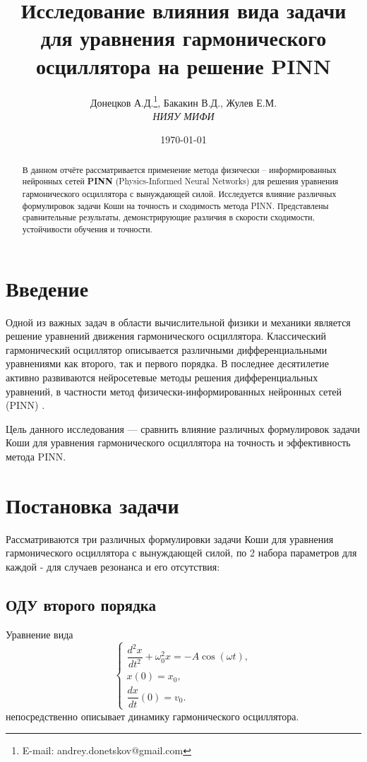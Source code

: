 \documentclass[12pt,a4paper]{article}
\title{Исследование влияния вида задачи для уравнения гармонического осциллятора на решение PINN}
\author{
Донецков А.Д.\thanks{E-mail: andrey.donetskov@gmail.com},
Бакакин В.Д.,
Жулев Е.М. \\
\textit{НИЯУ МИФИ}
}
\date{\today}
\begin{document}
\maketitle

\begin{abstract}
В данном отчёте рассматривается применение метода физически -- информированных нейронных сетей \textbf{PINN} (Physics-Informed Neural Networks) для решения уравнения гармонического осциллятора с вынуждающей силой. Исследуется влияние различных формулировок задачи Коши на точность и сходимость метода PINN. Представлены сравнительные результаты, демонстрирующие различия в скорости сходимости, устойчивости обучения и точности.
\end{abstract}

\section{Введение}
Одной из важных задач в области вычислительной физики и механики является решение уравнений движения гармонического осциллятора. Классический гармонический осциллятор описывается различными дифференциальными уравнениями как второго, так и первого порядка. В последнее десятилетие активно развиваются нейросетевые методы решения дифференциальных уравнений, в частности метод физически-информированных нейронных сетей (PINN) \cite{Lagaris1998,Raissi2019}.

Цель данного исследования --- сравнить влияние различных формулировок задачи Коши для уравнения гармонического осциллятора на точность и эффективность метода PINN.

\section{Постановка задачи}
Рассматриваются три различных формулировки задачи Коши для уравнения гармонического осциллятора с вынуждающей силой, по 2 набора параметров для каждой - для случаев резонанса и его отсутствия:

\subsection{ОДУ второго порядка}
Уравнение вида
\begin{equation}
\begin{cases}
\dfrac{d^2x}{dt^2} + \omega_0^2 x = -A\cos(\omega t), \\
x(0) = x_0, \\
\dfrac{dx}{dt}(0) = v_0.
\end{cases}
\end{equation}
непосредственно описывает динамику гармонического осциллятора.
\end{document}
